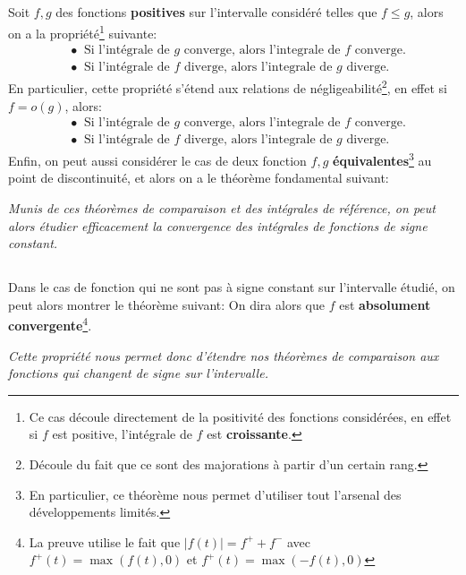 \subsection*{}
Soit \(f, g\) des fonctions \textbf{positives} sur l'intervalle considéré telles que \(f \leq g\), alors on a la propriété\footnote[1]{Ce cas découle directement de la positivité des fonctions considérées, en effet si \(f\) est positive, l'intégrale de \(f\) est \textbf{croissante}.} suivante:
\begin{align*}
   &\bullet \;\; \text{Si l'intégrale de \(g\) converge, alors l'integrale de \(f\) converge.} \\
   &\bullet \;\; \text{Si l'intégrale de \(f\) diverge, alors l'integrale de \(g\) diverge.}
\end{align*}
En particulier, cette propriété s'étend aux relations de négligeabilité\footnote[2]{Découle du fait que ce sont des majorations à partir d'un certain rang.}, en effet si \(f = o(g)\), alors:
\begin{align*}
   &\bullet \;\; \text{Si l'intégrale de \(g\) converge, alors l'integrale de \(f\) converge.} \\
   &\bullet \;\; \text{Si l'intégrale de \(f\) diverge, alors l'integrale de \(g\) diverge.}
\end{align*}
Enfin, on peut aussi considérer le cas de deux fonction \(f, g\) \textbf{équivalentes}\footnote[3]{En particulier, ce théorème nous permet d'utiliser tout l'arsenal des développements limités.} au point de discontinuité, et alors on a le théorème fondamental suivant:
\begin{center}
   \textit{Munis de ces théorèmes de comparaison et des intégrales de référence, on peut alors étudier efficacement la convergence des intégrales de fonctions de signe constant.}
\end{center}
\subsection*{}
Dans le cas de fonction qui ne sont pas à signe constant sur l'intervalle étudié, on peut alors montrer le théorème suivant:
On dira alors que \(f\) est \textbf{absolument convergente}\footnote[4]{La preuve utilise le fait que \(|f(t)| = f^+ + f^-\) avec \(f^+(t) = \max(f(t), 0)\) et \(f^+(t) = \max(-f(t), 0)\)}.
\begin{center}
   \textit{Cette propriété nous permet donc d'étendre nos théorèmes de comparaison aux fonctions qui changent de signe sur l'intervalle.}
\end{center}
